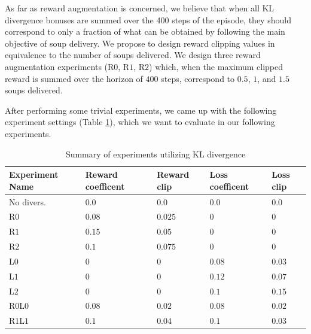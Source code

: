 As far as reward augmentation is concerned, we believe that when all KL divergence bonuses are summed over the 400 steps of the episode, they should correspond to only a fraction of what can be obtained by following the main objective of soup delivery.
We propose to design reward clipping values in equivalence to the number of soups delivered.
We design three reward augmentation experiments (R$0$, R$1$, R$2$) which, when the maximum clipped reward is summed over the horizon of $400$ steps, correspond to $0.5$, $1$, and $1.5$ soups delivered.

After performing some trivial experiments, we came up with the following experiment settings (Table \ref{tab:KLDiv-coefiicents}), which we want to evaluate in our following experiments.



\begin{table}[htbp]
    \small
    \centering
    \begin{tabular}{lllll}
      \toprule
      Experiment Name        & Reward coefficent     & Reward clip  & Loss coefficent  & Loss clip          \\ \midrule

      No divers.     & $0.0$     & $0.0$   & $0.0$     & $0.0$                        \\\midrule  
      R$0$     & $0.08$     & $0.025$   & $0$     & $0$                        \\
      R$1$     & $0.15$     & $0.05$   & $0$     & $0$                        \\
      R$2$     & $0.1$     & $0.075$   & $0$     & $0$                        \\\midrule
      L$0$     & $0$     & $0$   & $0.08$     & $0.03$                        \\
      L$1$     & $0$     & $0$   & $0.12$     & $0.07$                        \\      
      L$2$     & $0$     & $0$   & $0.1$     & $0.15$                        \\\midrule      
      R$0$L$0$     & $0.08$     & $0.02$   & $0.08$     & $0.02$                        \\
      R$1$L$1$     & $0.1$     & $0.04$   & $0.1$     & $0.03$                        \\
      
     \bottomrule
    \end{tabular}
    \caption{Summary of experiments utilizing KL divergence}
    \label{tab:KLDiv-coefiicents}
\end{table}


